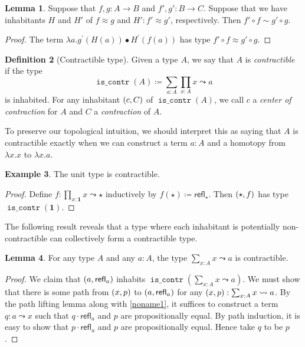 \documentclass[10pt,letterpaper,cm]{nupset}
\theoremstyle{definition}
\newtheorem{definition}{Definition}[subsection]
\newtheorem{exmp}[definition]{Example}
\theoremstyle{theorem}
\newtheorem{lemma}[definition]{Lemma}
\theoremstyle{remark}
\newcommand{\refl}{\mathsf{refl}}
\newcommand{\0}{\mathbf{0}}
\newcommand{\1}{\mathbf{1}}
\newcommand{\2}{\mathbf{2}}
\DeclareMathOperator{\iscont}{\mathtt{is\_contr}}
\begin{document}
\begin{lemma}\label{htpy-comp}
Suppose that $f,g: A\to B$ and $f',g' : B \to C$. Suppose that we have inhabitants $H$ and $H'$ of $f \approx g$ and $H' : f' \approx g'$, respectively. Then $f' \circ f \sim g' \circ g$.  
\end{lemma}
\begin{proof}
The term $\lambda a .g^{\prime}(H(a)) \bullet H^{\prime}(f(a))$ has type $f' \circ f \approx g' \circ g$.
\end{proof}

\smallskip

\begin{definition}[Contractible type]
Given a type $A$, we say that $A$ is \textit{contractible} if  the type
\[
\iscont(A)\coloneqq \sum_{a:A}\prod_{x:A}x \leadsto a
\] is inhabited.  For any inhabitant $\mleft(c, C\mright)$ of $\iscont(A)$, we call $c$ a \textit{center of contraction} for $A$ and $C$ a \textit{contraction} of $A$.
\end{definition}

To preserve our topological intuition, we should interpret this as saying that $A$ is contractible exactly when we can construct a term $a:A$ and a homotopy from $\lambda x.x$ to $\lambda x.a$.


\begin{exmp} 
 The unit type is contractible.
\end{exmp}
\begin{proof}
Define $f: \prod_{x: \1} x \leadsto \star$ inductively by $f(\star) \coloneqq \refl_{\star}$. Then  $\mleft(\star, f\mright)$ has type $\iscont(\1)$. 
\end{proof}



The following result reveals that a type where each inhabitant is potentially non-contractible can collectively form a contractible type.

\begin{lemma}\label{total-cont}
For any type $A$ and any $a:A$, the type $\sum_{x:A}x \leadsto a$ is contractible.
\end{lemma}
\begin{proof}
 We claim that $\mleft(a, \refl_a\mright)$ inhabits $\iscont(\sum_{x:A}x \leadsto a)$. We must show that there is some  path from $\mleft(x,p\mright)$ to $\mleft(a, \refl_a\mright)$ for any $\mleft(x,p\mright) : \sum_{x:A}x \leadsto a$. By the path lifting lemma along with \cref{noname1}, it suffices to construct a term $q: a \leadsto x$ such that $q\cdot \refl_a$ and $p$ are propositionally equal. By path induction, it is easy to show that $p \cdot \refl_a$ and $p$ are propositionally equal. Hence take $q$ to be $p$.
\end{proof}
\end{document}
